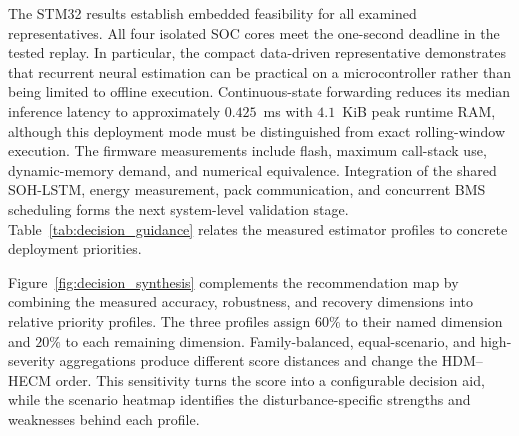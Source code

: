 \documentclass[review,nopreprintline]{elsarticle}
\begin{document}
The STM32 results establish embedded feasibility for all examined representatives. All four isolated SOC cores meet the one-second deadline in the tested replay. In particular, the compact data-driven representative demonstrates that recurrent neural estimation can be practical on a microcontroller rather than being limited to offline execution. Continuous-state forwarding reduces its median inference latency to approximately $0.425$~ms with $4.1$~KiB peak runtime RAM, although this deployment mode must be distinguished from exact rolling-window execution. The firmware measurements include flash, maximum call-stack use, dynamic-memory demand, and numerical equivalence. Integration of the shared SOH-LSTM, energy measurement, pack communication, and concurrent BMS scheduling forms the next system-level validation stage. Table~\ref{tab:decision_guidance} relates the measured estimator profiles to concrete deployment priorities.

Figure~\ref{fig:decision_synthesis} complements the recommendation map by combining the measured accuracy, robustness, and recovery dimensions into relative priority profiles. The three profiles assign $60\%$ to their named dimension and $20\%$ to each remaining dimension. Family-balanced, equal-scenario, and high-severity aggregations produce different score distances and change the HDM--HECM order. This sensitivity turns the score into a configurable decision aid, while the scenario heatmap identifies the disturbance-specific strengths and weaknesses behind each profile.
\end{document}
